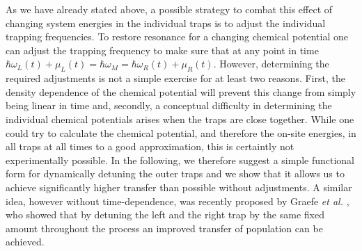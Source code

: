 As we have already stated above, a possible strategy to combat this
effect of changing system energies in the individual traps is to
adjust the individual trapping frequencies.  To restore resonance for
a changing chemical potential one can adjust the trapping frequency to
make sure that at any point in time $\hbar\omega_L(t)+\mu_L(t) =
\hbar\omega_M = \hbar\omega_R(t)+\mu_R(t)$. However, determining the required
adjustments is not a simple exercise for at least two reasons. First, the 
density dependence of the chemical potential will
prevent this change from simply being linear in time and, secondly, a
conceptual difficulty in determining the individual chemical
potentials arises when the traps are close together.  While one could
try to calculate the chemical potential, and therefore the on-site
energies, in all traps at all times to a good approximation, this is certaintly
not experimentally possible. In the following, we therefore
suggest a simple functional form for dynamically detuning the outer
traps and we show that it allows us to achieve significantly higher
transfer than possible without adjustments. A similar idea, however
without time-dependence, was recently proposed by Graefe {\sl et al.}
\cite{Graefe:06}, who showed that by detuning the left and the right
trap by the same fixed amount throughout the process an improved
transfer of population can be achieved.

